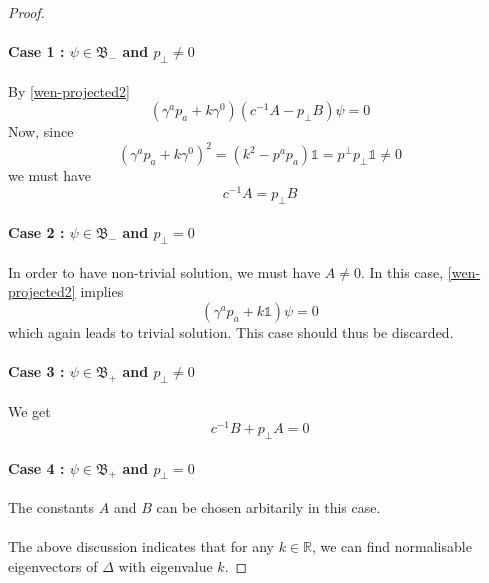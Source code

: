 \begin{proof}
\paragraph{Case 1 : $\psi \in \mathfrak{B}_-$ and $p_\bot \neq 0$} 
By \cref{wen-projected2}
\begin{equation*}
(\gamma^a p_a + k\gamma^0)(c^{-1}A - p_\bot B) \psi = 0
\end{equation*}
Now, since 
\begin{equation*}
(\gamma^a p_a + k\gamma^0)^2 = ( k^2 - p^a p_a ) \mathbb{1}= p^\bot p_\bot \mathbb{1} \neq 0
\end{equation*}
we must have 
\begin{equation*}
c^{-1} A = p_\bot B
\end{equation*}
\paragraph{Case 2 : $\psi \in \mathfrak{B}_-$ and $p_\bot = 0$}
In order to have non-trivial solution, 
we must have $A \neq 0$. 
In this case, 
\cref{wen-projected2} implies 
\begin{equation*}
(\gamma^a p_a + k \mathbb{1})\psi = 0
\end{equation*}
which again leads to trivial solution. 
This case should thus be discarded.
\paragraph{Case 3 : $\psi \in \mathfrak{B}_+$ and $p_\bot \neq 0$}
We get 
\begin{equation*}
c^{-1} B + p_\bot A = 0
\end{equation*}
\paragraph{Case 4 : $\psi \in \mathfrak{B}_+$ and $p_\bot = 0$}
The constants $A$ and $B$ can be chosen arbitarily in this case. \\\\
The above discussion indicates that for any $k \in \mathbb{R}$, 
we can find normalisable eigenvectors of $\Delta$ with eigenvalue $k$.
\end{proof}